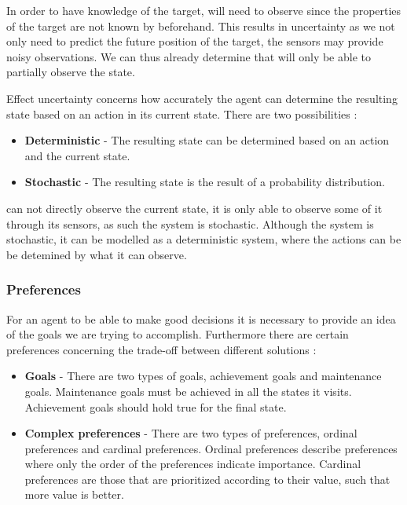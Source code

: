 In order to have knowledge of the target, \name will need to observe since the
properties of the target are not known by \name beforehand. This results in
uncertainty as we not only need to predict the future position of the target,
the sensors may provide noisy observations. We can thus already determine that
\name will only be able to partially observe the state.\nl

Effect uncertainty concerns how accurately the agent can determine the resulting
state based on an action in its current state. There are two possibilities
\citep[ch.1.5.4]{MIBook}:
\begin{itemize}
  \item \textbf{Deterministic} - The resulting state can be determined based on
  an action and the current state.
  \item \textbf{Stochastic} - The resulting state is the result of a probability
  distribution.
\end{itemize}

\name can not directly observe the current state, it is only able
to observe some of it through its sensors, as such the system is stochastic.
Although the system is stochastic, it can be modelled as a deterministic system, where
the actions can be be detemined by what it can observe.
 
\subsubsection{Preferences}
For an agent to be able to make good decisions it is necessary to provide an
idea of the goals we are trying to accomplish. Furthermore there are certain
preferences concerning the trade-off between different solutions
\citep[ch.1.5.5]{MIBook}:

\begin{itemize}
  \item \textbf{Goals} - There are two types of goals, achievement goals and
  maintenance goals. Maintenance goals must be achieved in all the states it
  visits. Achievement goals should hold true for the final state. 
  \item \textbf{Complex preferences} - There are two types of preferences,
  ordinal preferences and cardinal preferences. Ordinal preferences describe
  preferences where only the order of the preferences indicate importance.
  Cardinal preferences are those that are prioritized according to their value,
  such that more value is better.
\end{itemize}


